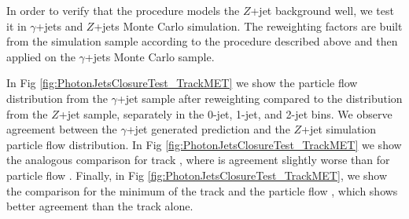 In order to verify that the procedure models the $Z$+jet background well, we test it
in $\gamma$+jets and $Z$+jets Monte Carlo simulation. The reweighting factors are 
built from the simulation sample according to the procedure described above and then 
applied on the $\gamma$+jets Monte Carlo sample. 




In Fig \ref{fig:PhotonJetsClosureTest_TrackMET} we show the particle flow \met distribution 
from the $\gamma$+jet sample after reweighting compared to the \met distribution from the 
$Z$+jet sample, separately in the 0-jet, 1-jet, and 2-jet bins. We observe agreement between 
the $\gamma$+jet generated prediction and the $Z$+jet simulation particle flow \met distribution. 
In Fig \ref{fig:PhotonJetsClosureTest_TrackMET} we show the analogous comparison for track \met, where 
is agreement slightly worse than for particle flow \met. Finally, in 
Fig \ref{fig:PhotonJetsClosureTest_TrackMET}, we show the comparison for the minimum of the 
track \met and the particle flow \met, which shows better agreement than the track \met alone. 

